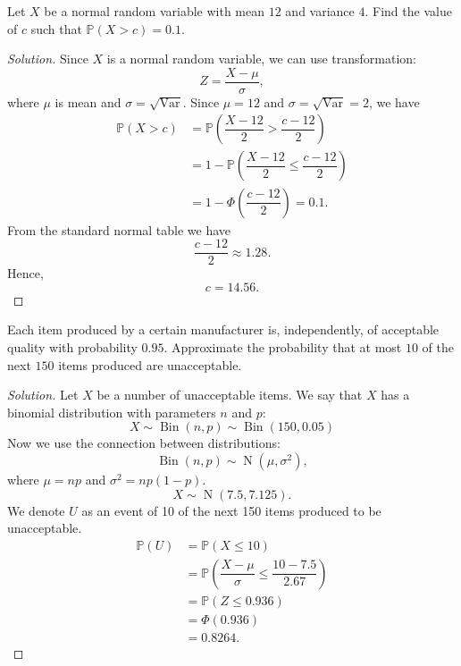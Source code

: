 \documentclass{article}[12pt]
\newenvironment{solution}
  {\renewcommand\qedsymbol{$\blacksquare$}\begin{proof}[Solution]}
  {\end{proof}}
\newenvironment{problem}[1]
  {\renewcommand\theinnercustomprblm{#1}\innercustomprblm}
  {\endinnercustomprblm}
\DeclareMathOperator{\Norm}{N}
\DeclareMathOperator{\Var}{Var}
\DeclareMathOperator{\Bin}{Bin}
\renewcommand{\P}{\mathbb{P}}
\begin{document}
\begin{problem}{5.19}\normalfont
Let $X$ be a normal random variable with mean $12$ and variance $4$.
Find the value of $c$ such that $\mathbb{P}(X > c) = 0.1$.
\end{problem}
\begin{solution}
Since $X$ is a normal random variable, we can use transformation:
\begin{equation*}
    Z = \dfrac{X -\mu}{\sigma},
\end{equation*}
where $\mu$ is mean and $\sigma = \sqrt{\Var}$.
Since $\mu = 12$ and $\sigma = \sqrt{\Var} = 2$, we have
\begin{align*}
    \P(X > c) &=\P\left(\dfrac{X - 12}{2} > \dfrac{c - 12}{2}\right)
    \\
    &= 1 -\P\left(\dfrac{X - 12}{2}\leqslant\dfrac{c - 12}{2}\right)
    \\
    &= 1 -\Phi\left(\dfrac{c - 12}{2}\right) = 0.1.
\end{align*}
From the standard normal table we have
\begin{equation*}
    \dfrac{c - 12}{2}\approx 1.28.
\end{equation*}
Hence,
\begin{equation*}
    c = 14.56.
\end{equation*}
\end{solution}

\begin{problem}{5.25}\normalfont
Each item produced by a certain manufacturer is, independently, of acceptable quality with probability $0.95$.
Approximate the probability that at most $10$ of the next $150$ items produced are unacceptable.
\end{problem}
\begin{solution}
Let $X$ be a number of unacceptable items.
We say that $X$ has a binomial distribution with parameters $n$ and $p$:
\begin{equation*}
    X\sim\Bin(n, p)\sim\Bin(150, 0.05)
\end{equation*}
Now we use the connection between distributions:
\begin{equation*}
    \Bin(n, p)\sim\Norm(\mu,\sigma^{2}),
\end{equation*}
where $\mu = np$ and $\sigma^{2} = np(1 - p)$.
\begin{equation*}
    X\sim\Norm(7.5, 7.125).
\end{equation*}
We denote $U$ as an event of 10 of the next 150 items produced to be unacceptable.
\begin{align*}
    \P(U) &=\P(X \leqslant 10)
    \\
    &=\P\left(\dfrac{X -\mu}{\sigma}\leqslant\dfrac{10 - 7.5}{2.67}\right)
    \\
    &=\P(Z\leqslant 0.936)
    \\
    &=\Phi(0.936)
    \\
    &= 0.8264.
\end{align*}
\end{solution}
\end{document}
